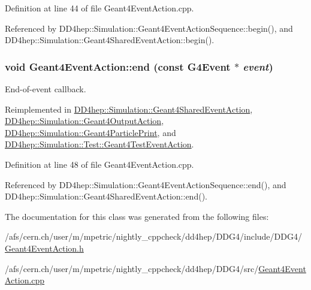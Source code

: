 Definition at line 44 of file Geant4EventAction.cpp.

Referenced by DD4hep::Simulation::Geant4EventActionSequence::begin(), and DD4hep::Simulation::Geant4SharedEventAction::begin().\hypertarget{class_d_d4hep_1_1_simulation_1_1_geant4_event_action_af131bad73c28da3419af7c29e0b8c250}{
\subsubsection[{end}]{\setlength{\rightskip}{0pt plus 5cm}void Geant4EventAction::end (const G4Event $\ast$ {\em event})}}
\label{class_d_d4hep_1_1_simulation_1_1_geant4_event_action_af131bad73c28da3419af7c29e0b8c250}


End-\/of-\/event callback. 

Reimplemented in \hyperlink{class_d_d4hep_1_1_simulation_1_1_geant4_shared_event_action_a207f1882eece3c87364b38b266bd9935}{DD4hep::Simulation::Geant4SharedEventAction}, \hyperlink{class_d_d4hep_1_1_simulation_1_1_geant4_output_action_a6fa4e933973a42a00b7be10292619780}{DD4hep::Simulation::Geant4OutputAction}, \hyperlink{class_d_d4hep_1_1_simulation_1_1_geant4_particle_print_ad2ba85711f58068667eb94d1f6b80012}{DD4hep::Simulation::Geant4ParticlePrint}, and \hyperlink{class_d_d4hep_1_1_simulation_1_1_test_1_1_geant4_test_event_action_a1b436d5b8c7b3f9fa93bc2b04946cad3}{DD4hep::Simulation::Test::Geant4TestEventAction}.

Definition at line 48 of file Geant4EventAction.cpp.

Referenced by DD4hep::Simulation::Geant4EventActionSequence::end(), and DD4hep::Simulation::Geant4SharedEventAction::end().

The documentation for this class was generated from the following files:\begin{DoxyCompactItemize}
\item 
/afs/cern.ch/user/m/mpetric/nightly\_\-cppcheck/dd4hep/DDG4/include/DDG4/\hyperlink{_geant4_event_action_8h}{Geant4EventAction.h}\item 
/afs/cern.ch/user/m/mpetric/nightly\_\-cppcheck/dd4hep/DDG4/src/\hyperlink{_geant4_event_action_8cpp}{Geant4EventAction.cpp}\end{DoxyCompactItemize}
